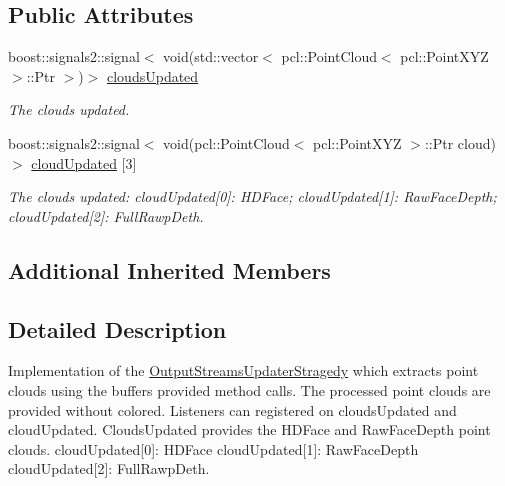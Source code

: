 \subsection*{Public Attributes}
\begin{DoxyCompactItemize}
\item 
\hypertarget{class_uncolored_output_streams_updater_a74fe41eccc0f4a72ea0b185b385f33ef}{}boost\+::signals2\+::signal$<$ void(std\+::vector$<$ pcl\+::\+Point\+Cloud$<$ pcl\+::\+Point\+X\+Y\+Z $>$\+::Ptr $>$)$>$ \hyperlink{class_uncolored_output_streams_updater_a74fe41eccc0f4a72ea0b185b385f33ef}{clouds\+Updated}\label{class_uncolored_output_streams_updater_a74fe41eccc0f4a72ea0b185b385f33ef}

\begin{DoxyCompactList}\small\item\em The clouds updated. \end{DoxyCompactList}\item 
\hypertarget{class_uncolored_output_streams_updater_aacae572a80c079c7305d629de2a63773}{}boost\+::signals2\+::signal$<$ void(pcl\+::\+Point\+Cloud$<$ pcl\+::\+Point\+X\+Y\+Z $>$\+::Ptr cloud)$>$ \hyperlink{class_uncolored_output_streams_updater_aacae572a80c079c7305d629de2a63773}{cloud\+Updated} \mbox{[}3\mbox{]}\label{class_uncolored_output_streams_updater_aacae572a80c079c7305d629de2a63773}

\begin{DoxyCompactList}\small\item\em The clouds updated\+: cloud\+Updated\mbox{[}0\mbox{]}\+: H\+D\+Face; cloud\+Updated\mbox{[}1\mbox{]}\+: Raw\+Face\+Depth; cloud\+Updated\mbox{[}2\mbox{]}\+: Full\+Rawp\+Deth. \end{DoxyCompactList}\end{DoxyCompactItemize}
\subsection*{Additional Inherited Members}


\subsection{Detailed Description}
Implementation of the \hyperlink{class_output_streams_updater_stragedy}{Output\+Streams\+Updater\+Stragedy} which extracts point clouds using the buffers provided method calls. The processed point clouds are provided without colored. Listeners can registered on clouds\+Updated and cloud\+Updated. Clouds\+Updated provides the H\+D\+Face and Raw\+Face\+Depth point clouds. cloud\+Updated\mbox{[}0\mbox{]}\+: H\+D\+Face cloud\+Updated\mbox{[}1\mbox{]}\+: Raw\+Face\+Depth cloud\+Updated\mbox{[}2\mbox{]}\+: Full\+Rawp\+Deth. 

